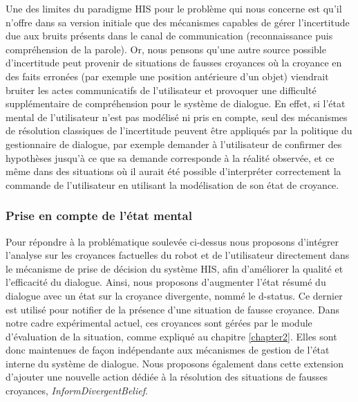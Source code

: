 \documentclass[a4paper,11pt,twoside]{StyleThese}
\begin{document}
Une des limites du paradigme HIS pour le problème qui nous concerne est qu’il
n’offre dans sa version initiale que des mécanismes capables de gérer l’incertitude due aux bruits présents dans le canal de communication (reconnaissance puis compréhension
de la parole). 
Or, nous pensons qu’une autre source possible d'incertitude peut
provenir de situations de fausses croyances où la croyance en des faits erronées (par exemple une position antérieure d’un objet) viendrait bruiter les actes  communicatifs
de l’utilisateur et provoquer une difficulté supplémentaire de compréhension pour le système de dialogue. En effet, si l’état mental de l’utilisateur n’est pas modélisé ni pris en compte, seul des mécanismes de résolution classiques de l’incertitude peuvent être appliqués par la politique du gestionnaire de dialogue, par exemple demander à l’utilisateur de confirmer des hypothèses
jusqu’à ce que sa demande corresponde à la réalité observée, et ce même dans
des situations où il aurait été possible d'interpréter correctement la commande de l'utilisateur en utilisant la modélisation de son état de croyance.




\subsubsection{Prise en compte de l'état mental}
\label{sec:mentalStateDial}
Pour répondre à la problématique soulevée ci-dessus nous proposons d'intégrer l’analyse sur les
croyances factuelles du robot et de l’utilisateur directement dans le mécanisme de prise
de décision du système HIS, afin d'améliorer la qualité et l’efficacité du dialogue. Ainsi, nous proposons d’augmenter l’état résumé du dialogue avec un état sur la croyance divergente, nommé le
d-status. Ce dernier est utilisé pour notifier de la présence d’une situation de fausse croyance.
Dans notre cadre expérimental actuel, ces croyances sont gérées par le module d'évaluation de la situation, comme expliqué au chapitre \ref{chapter2}. Elles sont donc maintenues de façon indépendante aux mécanismes de gestion de l’état interne du système de dialogue. Nous proposons également dans cette extension d’ajouter une nouvelle action dédiée à la résolution des situations de fausses croyances, \textit{InformDivergentBelief}.
\end{document}
